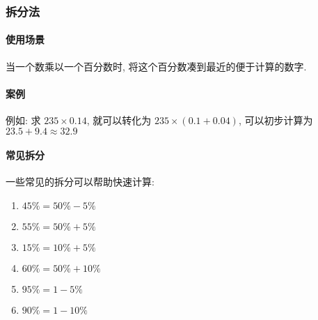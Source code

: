 \subsubsection{拆分法}

\paragraph{使用场景} 当一个数乘以一个百分数时, 将这个百分数凑到最近的便于计算的数字.

\paragraph{案例} 例如: 求 $235 \times 0.14$, 就可以转化为 $235 \times (0.1 + 0.04)$, 可以初步计算为$23.5 + 9.4 \approx 32.9$

\paragraph{常见拆分} 一些常见的拆分可以帮助快速计算:

\begin{multicols}{2}
	\begin{enumerate}
		\item $45\% = 50\% - 5\%$
		\item $55\% = 50\% + 5\%$
		\item $15\% = 10\% + 5\%$
		\item $60\% = 50\% + 10\%$
		\item $95\% = 1 - 5\%$
		\item $90\% = 1 - 10\%$
	\end{enumerate}
\end{multicols}

